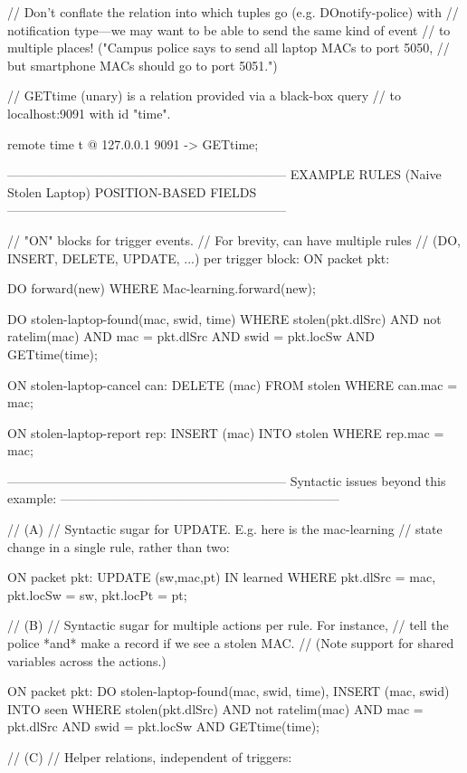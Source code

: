   // Don't conflate the relation into which tuples go (e.g. DOnotify-police) with
  // notification type---we may want to be able to send the same kind of event
  // to multiple places! ("Campus police says to send all laptop MACs to port 5050,
  // but smartphone MACs should go to port 5051.")

  // GETtime (unary) is a relation provided via a black-box query
  // to localhost:9091 with id "time".

  remote time {t} @ 127.0.0.1 9091 -> 
    GETtime; 

------------------------------------------------------------------
EXAMPLE RULES (Naive Stolen Laptop)
POSITION-BASED FIELDS
------------------------------------------------------------------

// "ON" blocks for trigger events.
// For brevity, can have multiple rules 
// (DO, INSERT, DELETE, UPDATE, ...) per trigger block:
ON packet pkt:

  DO forward(new) WHERE
    Mac-learning.forward(new);

  DO stolen-laptop-found(mac, swid, time) WHERE  
    stolen(pkt.dlSrc) AND
    not ratelim(mac) AND    
    mac = pkt.dlSrc AND 
    swid = pkt.locSw AND
    GETtime(time);

ON stolen-laptop-cancel can:
  DELETE (mac) FROM stolen WHERE
    can.mac = mac;

ON stolen-laptop-report rep:
  INSERT (mac) INTO stolen WHERE
    rep.mac = mac;

------------------------------------------------------------------
Syntactic issues beyond this example:
------------------------------------------------------------------

// (A)
// Syntactic sugar for UPDATE. E.g. here is the mac-learning 
// state change in a single rule, rather than two:

ON packet pkt:
  UPDATE (sw,mac,pt) IN learned WHERE
    pkt.dlSrc = mac,
    pkt.locSw = sw,
    pkt.locPt = pt;

// (B)
// Syntactic sugar for multiple actions per rule. For instance, 
// tell the police *and* make a record if we see a stolen MAC.
// (Note support for shared variables across the actions.)

ON packet pkt:
  DO stolen-laptop-found(mac, swid, time),
  INSERT (mac, swid) INTO seen WHERE  
    stolen(pkt.dlSrc) AND
    not ratelim(mac) AND    
    mac = pkt.dlSrc AND 
    swid = pkt.locSw AND
    GETtime(time);

// (C)
// Helper relations, independent of triggers:

